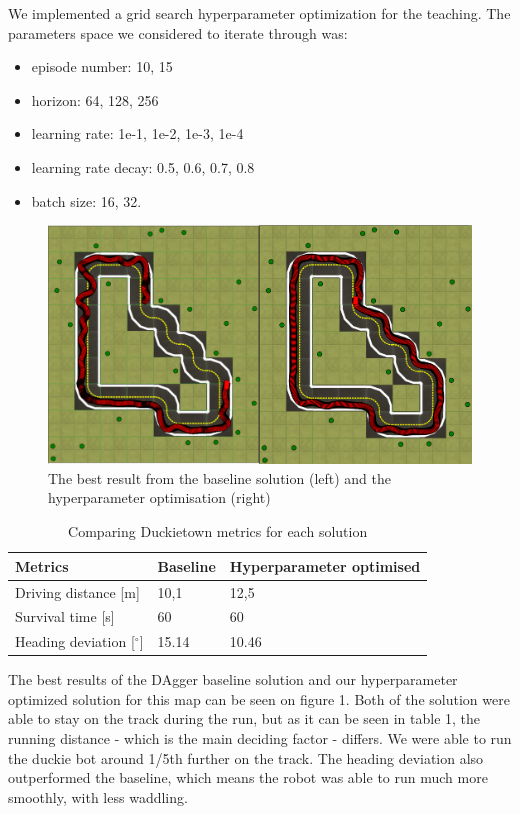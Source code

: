\documentclass{article}
\begin{document}
We implemented a grid search hyperparameter optimization for the teaching. The parameters space we considered to iterate through was: 
\begin{itemize}

\item episode number: 10, 15
\item horizon: 64, 128, 256
\item learning rate: 1e-1, 1e-2, 1e-3, 1e-4
\item learning rate decay: 0.5, 0.6, 0.7, 0.8
\item batch size: 16, 32.
\newpage

\end{itemize}

\begin{figure}
    \centering
    \includegraphics[width=0.8\linewidth]{eredmeny_egyben.png}
    \caption{The best result from the baseline solution (left) and the hyperparameter optimisation (right)}
    \label{fig:result}
\end{figure}


\begin{table}[t]
  \caption{Comparing Duckietown metrics for each solution}
  \label{sample-table}
  \centering
  \begin{tabular}{lll}
   \toprule
    Metrics     & Baseline     & Hyperparameter optimised \\
    \midrule
    Driving distance [m] &  10,1  & 12,5     \\
    Survival time [s] &  60  &  60    \\
    Heading deviation [$^{\circ}$] & 15.14 & 10.46 \\
    \bottomrule
  \end{tabular}
\end{table}

The best results of the DAgger baseline solution and our hyperparameter optimized solution for this map can be seen on figure 1. Both of the solution were able to stay on the track during the run, but as it can be seen in table 1, the running distance - which is the main deciding factor - differs. We were able to run the duckie bot around 1/5th further on the track. The heading deviation also outperformed the baseline, which means the robot was able to run much more smoothly, with less waddling.
\end{document}
